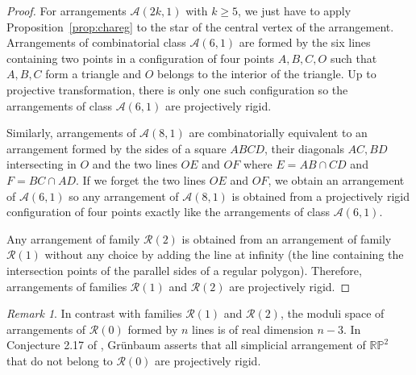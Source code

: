 \documentclass[a4paper,11pt,reqno]{amsart}
\theoremstyle{definition}
\theoremstyle{remark}
\newtheorem{rem}[thm]{Remark}
\theoremstyle{definition}
\theoremstyle{definition}
\theoremstyle{definition}
\numberwithin{equation}{section}
\begin{document}
\begin{proof}
For arrangements $\mathcal{A}(2k,1)$ with $k \geq 5$, we just have to apply Proposition~\ref{prop:chareg} to the star of the central vertex of the arrangement. Arrangements of combinatorial class $\mathcal{A}(6,1)$ are formed by the six lines containing two points in a configuration of four points $A,B,C,O$ such that $A,B,C$ form a triangle and $O$ belongs to the interior of the triangle. Up to projective transformation, there is only one such configuration so the arrangements of class $\mathcal{A}(6,1)$ are projectively rigid.
\par
Similarly, arrangements of $\mathcal{A}(8,1)$ are combinatorially equivalent to an arrangement formed by the sides of a square $ABCD$, their diagonals $AC,BD$ intersecting in $O$ and the two lines $OE$ and $OF$ where $E=AB \cap CD$ and $F=BC \cap AD$. If we forget the two lines $OE$ and $OF$, we obtain an arrangement of $\mathcal{A}(6,1)$ so any arrangement of $\mathcal{A}(8,1)$ is obtained from a projectively rigid configuration of four points exactly like the arrangements of  class $\mathcal{A}(6,1)$.
\par
Any arrangement of family $\mathcal{R}(2)$ is obtained from an arrangement of family $\mathcal{R}(1)$ without any choice by adding the line at infinity (the line containing the intersection points of the parallel sides of a regular polygon). Therefore, arrangements of families $\mathcal{R}(1)$ and $\mathcal{R}(2)$ are projectively rigid.
\end{proof}

\begin{rem}
In contrast with families $\mathcal{R}(1)$ and $\mathcal{R}(2)$, the moduli space of arrangements of $\mathcal{R}(0)$ formed by $n$ lines is of real dimension $n-3$. In Conjecture 2.17 of \cite{Gr0}, Gr\"{u}nbaum
asserts that all simplicial arrangement of $\mathbb{RP}^{2}$ that do not belong to $\mathcal{R}(0)$ are projectively rigid.
\end{rem} 
\end{document}
